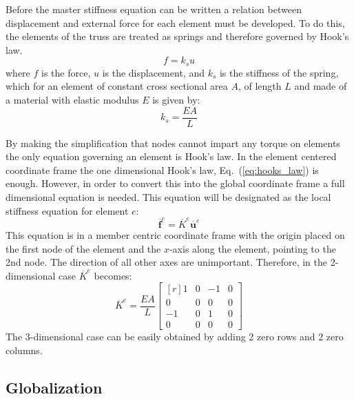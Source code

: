 \documentclass{article}
\begin{document}
Before the master stiffness equation can be written a relation between
displacement and external force for each element must be developed.  To do
this, the elements of the truss are treated as springs and therefore governed
by Hook's law.
\begin{equation}
    f=k_su \label{eq:hooks_law}
\end{equation}
where $f$ is the force, $u$ is the displacement, and $k_s$ is the stiffness of
the spring, which for an element of constant cross sectional area $A$, of
length $L$ and made of a material with elastic modulus $E$ is given by:
\begin{equation}
    k_s=\frac{EA}{L} \label{eq:stiffness_coefficient}
\end{equation}

By making the simplification that nodes cannot impart any torque on elements
the only equation governing an element is Hook's law.  In the element centered
coordinate frame the one dimensional Hook's law, Eq.~(\ref{eq:hooks_law}) is
enough.  However, in order to convert this into the global coordinate frame a
full dimensional equation is needed.  This equation will be designated as the
local stiffness equation for element $e$:
\begin{equation}
    \overline{\mathbf{f}}^e=\overline{K}^e\overline{\mathbf{u}}^e
    \label{eq:local_stiffness_equation}
\end{equation}
This equation is in a member centric coordinate frame with the origin placed
on the first node of the element and the $x$-axis along the element, pointing
to the 2nd node.  The direction of all other axes are unimportant.  Therefore,
in the 2-dimensional case $\overline{K}^e$ becomes:
\begin{equation}
    \overline{K}^e=\frac{EA}{L}\begin{bmatrix*}[r]
        1&0&-1&0\\
        0&0&0&0\\
        -1&0&1&0\\
        0&0&0&0
    \end{bmatrix*} \label{eq:kbar}
\end{equation}
The 3-dimensional case can be easily obtained by adding 2 zero rows and 2 zero
columns.




\subsection{Globalization}
\end{document}
